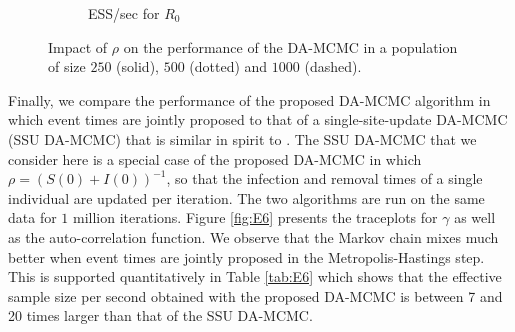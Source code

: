\documentclass[11pt]{article}
\newcommand{\ram}[1]{{\color{green}{ #1}}}
\begin{document}
\begin{figure}
\begin{subfigure}[b]{0.41\textwidth}
			\caption{ESS/sec for $R_0$
			}
			\label{fig:E3_facet_ESSsecR0}
		\end{subfigure}
		\caption{Impact of $\rho$ on the performance of the DA-MCMC in a population of size $250$ (solid), $500$ (dotted) and $1000$ (dashed).}
		\label{fig:E3}
	\end{figure}
		
	Finally, we compare the performance of the proposed DA-MCMC algorithm in which event times are jointly proposed to that of a single-site-update DA-MCMC (SSU DA-MCMC) that is similar in spirit to \cite{Gibson.1998, ONeill.1999, Fintzi.2017}. The SSU DA-MCMC that we consider here is a special case of the proposed DA-MCMC in which $\rho = (S(0)+I(0))^{-1}$, so that the infection and removal times of a single individual are updated per iteration. The two algorithms are run on the same data for $1$ million iterations. Figure \ref{fig:E6} presents the traceplots for $\gamma$ as well as the auto-correlation function. We observe that the Markov chain mixes much better when event times are jointly proposed in the Metropolis-Hastings step. This is supported quantitatively in Table \ref{tab:E6} which shows that the effective sample size per second obtained with the proposed DA-MCMC is between 7 and 20 times larger than that of the SSU DA-MCMC.
	
	
 \ram{explain why not compare chain binomial, particle filtering (forward simulation), LNA requires noisy data.}
	
\end{document}
